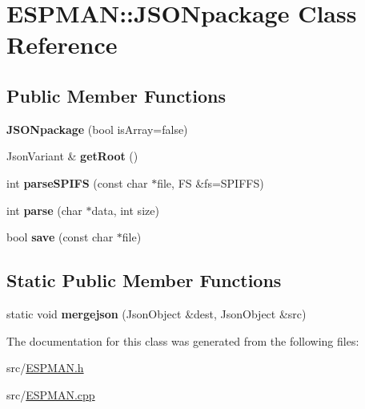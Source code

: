 \hypertarget{class_e_s_p_m_a_n_1_1_j_s_o_npackage}{}\section{E\+S\+P\+M\+AN\+:\+:J\+S\+O\+Npackage Class Reference}
\label{class_e_s_p_m_a_n_1_1_j_s_o_npackage}
\subsection*{Public Member Functions}
\begin{DoxyCompactItemize}
\item 
\mbox{\label{class_e_s_p_m_a_n_1_1_j_s_o_npackage_a2ccb4238cacc75894132f8d50f68e7ab}} 
{\bfseries J\+S\+O\+Npackage} (bool is\+Array=false)
\item 
\mbox{\label{class_e_s_p_m_a_n_1_1_j_s_o_npackage_aac25a41ff46bdbe8ffb7fa2734bf2b7e}} 
Json\+Variant \& {\bfseries get\+Root} ()
\item 
\mbox{\label{class_e_s_p_m_a_n_1_1_j_s_o_npackage_a108cba1a08b67062cb4673e9dc1b6cce}} 
int {\bfseries parse\+S\+P\+I\+FS} (const char $\ast$file, FS \&fs=S\+P\+I\+F\+FS)
\item 
\mbox{\label{class_e_s_p_m_a_n_1_1_j_s_o_npackage_a8bca1bff6ca00d696f8cbea49b06da4a}} 
int {\bfseries parse} (char $\ast$data, int size)
\item 
\mbox{\label{class_e_s_p_m_a_n_1_1_j_s_o_npackage_a602fc85ee5b09b7d1eb7e08f3dbbe772}} 
bool {\bfseries save} (const char $\ast$file)
\end{DoxyCompactItemize}
\subsection*{Static Public Member Functions}
\begin{DoxyCompactItemize}
\item 
\mbox{\label{class_e_s_p_m_a_n_1_1_j_s_o_npackage_a6eb74788124b334b2c9da777867f1ca2}} 
static void {\bfseries mergejson} (Json\+Object \&dest, Json\+Object \&src)
\end{DoxyCompactItemize}


The documentation for this class was generated from the following files\+:\begin{DoxyCompactItemize}
\item 
src/\hyperlink{_e_s_p_m_a_n_8h}{E\+S\+P\+M\+A\+N.\+h}\item 
src/\hyperlink{_e_s_p_m_a_n_8cpp}{E\+S\+P\+M\+A\+N.\+cpp}\end{DoxyCompactItemize}
